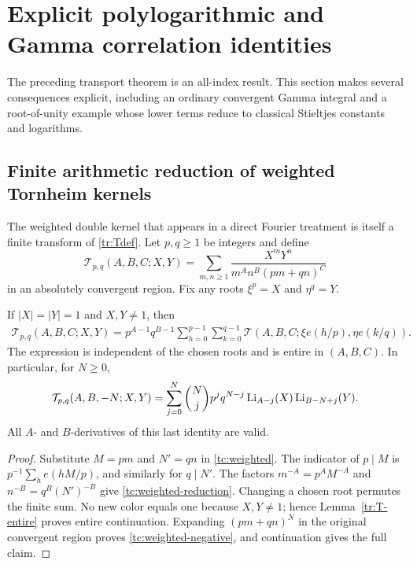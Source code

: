 \section{Explicit polylogarithmic and Gamma correlation identities}
\label{tc:section}

The preceding transport theorem is an all-index result. This section
makes several consequences explicit, including an ordinary convergent
Gamma integral and a root-of-unity example whose lower terms reduce to
classical Stieltjes constants and logarithms.

\subsection{Finite arithmetic reduction of weighted Tornheim kernels}
The weighted double kernel that appears in a direct Fourier treatment
is itself a finite transform of \eqref{tr:Tdef}. Let $p,q\geq1$ be
integers and define
\begin{equation}\label{tc:weighted}
 \mathcal T_{p,q}(A,B,C;X,Y)
   =\sum_{m,n\geq1}\frac{X^mY^n}{m^An^B(pm+qn)^C}
\end{equation}
in an absolutely convergent region. Fix any roots $\xi^p=X$ and
$\eta^q=Y$.

\begin{proposition}\label{tc:root-filter}
If $|X|=|Y|=1$ and $X,Y\ne1$, then
\begin{align}\label{tc:weighted-reduction}
 \mathcal T_{p,q}(A,B,C;X,Y)
 =p^{A-1}q^{B-1}
   \sum_{h=0}^{p-1}\sum_{k=0}^{q-1}
     \mathcal T(A,B,C;\xi e(h/p),\eta e(k/q)).
\end{align}
The expression is independent of the chosen roots and is entire in
$(A,B,C)$. In particular, for $N\geq0$,
\begin{align}\label{tc:weighted-negative}
 \mathcal T_{p,q}(A,B,-N;X,Y)
 =\sum_{j=0}^N\binom Nj p^jq^{N-j}
             \operatorname{Li}_{A-j}(X)\operatorname{Li}_{B-N+j}(Y).
\end{align}
All $A$- and $B$-derivatives of this last identity are valid.
\end{proposition}
\begin{proof}
Substitute $M=pm$ and $N'=qn$ in \eqref{tc:weighted}. The indicator
of $p\mid M$ is $p^{-1}\sum_he(hM/p)$, and similarly for $q\mid N'$.
The factors $m^{-A}=p^AM^{-A}$ and $n^{-B}=q^B(N')^{-B}$ give
\eqref{tc:weighted-reduction}. Changing a chosen root permutes the
finite sum. No new color equals one because $X,Y\ne1$; hence
Lemma~\ref{tr:T-entire} proves entire continuation. Expanding
$(pm+qn)^N$ in the original convergent region proves
\eqref{tc:weighted-negative}, and continuation gives the full claim.
\end{proof}

